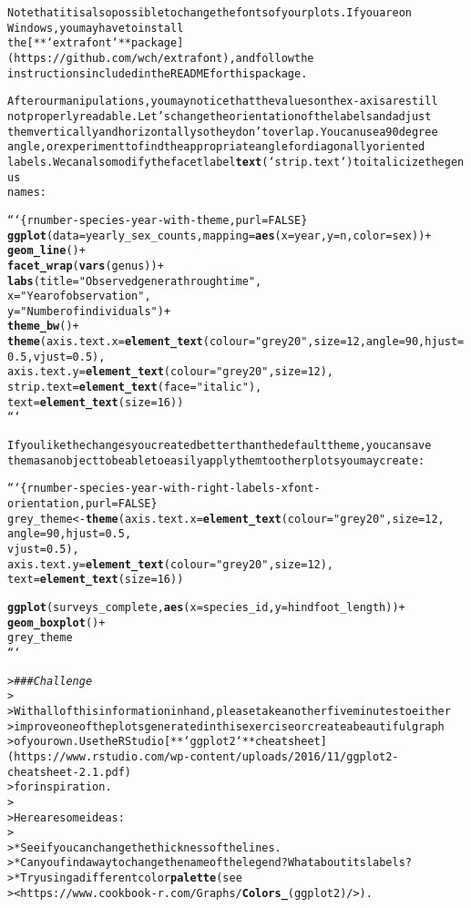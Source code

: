 \documentclass{article}\usepackage[]{graphicx}\usepackage[]{xcolor}
\makeatletter
\newcommand{\hlstr}[1]{\textcolor[rgb]{0.192,0.494,0.8}{#1}}%
\newcommand{\hlcom}[1]{\textcolor[rgb]{0.678,0.584,0.686}{\textit{#1}}}%
\newcommand{\hlkwd}[1]{\textcolor[rgb]{0.737,0.353,0.396}{\textbf{#1}}}%
\newenvironment{kframe}{%
 \def\at@end@of@kframe{}%
 \ifinner\ifhmode%
  \def\at@end@of@kframe{\end{minipage}}%
  \begin{minipage}{\columnwidth}%
 \fi\fi%
 \def\FrameCommand##1{\hskip\@totalleftmargin \hskip-\fboxsep
 \colorbox{shadecolor}{##1}\hskip-\fboxsep
     \hskip-\linewidth \hskip-\@totalleftmargin \hskip\columnwidth}%
 \MakeFramed {\advance\hsize-\width
   \@totalleftmargin\z@ \linewidth\hsize
   \@setminipage}}%
 {\par\unskip\endMakeFramed%
 \at@end@of@kframe}
\newenvironment{knitrout}{}{} %
\makeatother
\begin{document}
\begin{knitrout}
\begin{kframe}
\begin{alltt}
Note that it is also possible to change the fonts of your plots. If you are on
Windows, you may have to install
the [**`extrafont`** package](https://github.com/wch/extrafont), and follow the
instructions included in the README for this package.

After our manipulations, you may notice that the values on the x-axis are still
not properly readable. Let's change the orientation of the labels and adjust
them vertically and horizontally so they don't overlap. You can use a 90 degree
angle, or experiment to find the appropriate angle for diagonally oriented
labels. We can also modify the facet label \hlkwd{text} (`strip.text`) to italicize the genus
names:

```\{r number-species-year-with-theme, purl=FALSE\}
\hlkwd{ggplot}(data = yearly_sex_counts, mapping = \hlkwd{aes}(x = year, y = n, color = sex)) +
    \hlkwd{geom_line}() +
    \hlkwd{facet_wrap}(\hlkwd{vars}(genus)) +
    \hlkwd{labs}(title = \hlstr{"Observed genera through time"},
        x = \hlstr{"Year of observation"},
        y = \hlstr{"Number of individuals"}) +
    \hlkwd{theme_bw}() +
    \hlkwd{theme}(axis.text.x = \hlkwd{element_text}(colour = \hlstr{"grey20"}, size = 12, angle = 90, hjust = 0.5, vjust = 0.5),
                        axis.text.y = \hlkwd{element_text}(colour = \hlstr{"grey20"}, size = 12),
                        strip.text = \hlkwd{element_text}(face = \hlstr{"italic"}),
                        text = \hlkwd{element_text}(size = 16))
```

If you like the changes you created better than the default theme, you can save
them as an object to be able to easily apply them to other plots you may create:


```\{r number-species-year-with-right-labels-xfont-orientation, purl = FALSE\}
grey_theme <- \hlkwd{theme}(axis.text.x = \hlkwd{element_text}(colour=\hlstr{"grey20"}, size = 12,
                                               angle = 90, hjust = 0.5,
                                               vjust = 0.5),
                    axis.text.y = \hlkwd{element_text}(colour = \hlstr{"grey20"}, size = 12),
                    text=\hlkwd{element_text}(size = 16))

\hlkwd{ggplot}(surveys_complete, \hlkwd{aes}(x = species_id, y = hindfoot_length)) +
    \hlkwd{geom_boxplot}() +
    grey_theme
```

> \hlcom{### Challenge}
>
> With all of this information in hand, please take another five minutes to either
> improve one of the plots generated in this exercise or create a beautiful graph
> of your own. Use the RStudio [**`ggplot2`** cheat sheet](https://www.rstudio.com/wp-content/uploads/2016/11/ggplot2-cheatsheet-2.1.pdf)
> for inspiration.
>
> Here are some ideas:
>
> * See if you can change the thickness of the lines.
> * Can you find a way to change the name of the legend? What about its labels?
> * Try using a different color \hlkwd{palette} (see
>   <https://www.cookbook-r.com/Graphs/\hlkwd{Colors_}(ggplot2)/>).


\end{alltt}
\end{kframe}
\end{knitrout}
\end{document}
